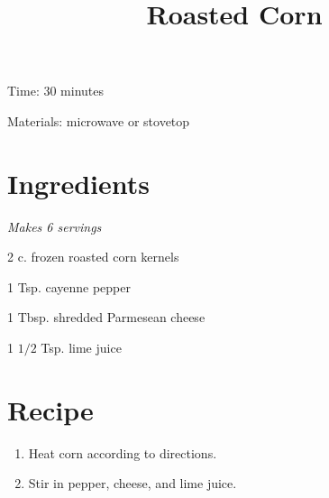 \documentclass{article}
\title{Roasted Corn}
\begin{document}
Time: 30 minutes

Materials: microwave or stovetop

\section{Ingredients}
\textit{Makes 6 servings}

2 c. frozen roasted corn kernels

1 Tsp. cayenne pepper

1 Tbsp. shredded Parmesean cheese

1 $1/2$ Tsp. lime juice

\section{Recipe}
\begin{enumerate}
\item{Heat corn according to directions.}
\item{Stir in pepper, cheese, and lime juice.}
\end{enumerate}
\end{document}
